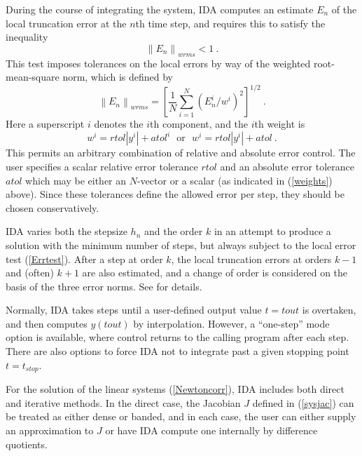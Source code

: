 During the course of integrating the system, IDA computes an estimate
$E_n$ of the local truncation error at the $n$th time step, and
requires this to satisfy the inequality
\begin{equation}
  \left\| E_n\right\|_{wrms} < 1 ~.                  \label{Errtest}
\end{equation}
This test imposes tolerances on the local errors by way of the weighted
root-mean-square norm, which is defined by
\[
\left\| E_n\right\|_{wrms} = \left[ \frac{1}{N} \sum_{i=1}^N 
    ( E_n^i / w^i ) ^2 \right] ^{1/2} ~.
\]
Here a superscript $i$ denotes the $i$th component, and the $i$th
weight is 
\begin{equation}
w^i = rtol |y^i| + atol^i ~~~ \mbox{or} ~~~ w^i = rtol |y^i| + atol ~.
                                                    \label{weights}
\end{equation}
This permits an arbitrary combination of relative and absolute error
control. The user specifies a scalar relative error tolerance $rtol$
and an absolute error tolerance $atol$ which may be either an
$N$-vector or a scalar (as indicated in (\ref{weights}) above).  
Since these tolerances define the allowed error per step, they should
be chosen conservatively.

IDA varies both the stepsize $h_n$ and the order $k$ in an attempt to
produce a solution with the minimum number of steps, but always
subject to the local error test (\ref{Errtest}).  After a step at
order $k$, the local truncation errors at orders $k-1$ and (often)
$k+1$ are also estimated, and a change of order is considered on the
basis of the three error norms.  See \cite{BrCaPe96} for details.  

Normally, IDA takes steps until a user-defined output value $t = tout$
is overtaken, and then computes $y(tout)$ by interpolation.  However,
a ``one-step'' mode option is available, where control returns to the
calling program after each step.  There are also options to force IDA
not to integrate past a given stopping point $t = t_{stop}$.

For the solution of the linear systems (\ref{Newtoncorr}), IDA includes
both direct and iterative methods.  In the direct case, the Jacobian
$J$ defined in (\ref{sysjac}) can be treated as either dense or banded,
and in each case, the user can either supply an approximation to $J$
or have IDA compute one internally by difference quotients.

